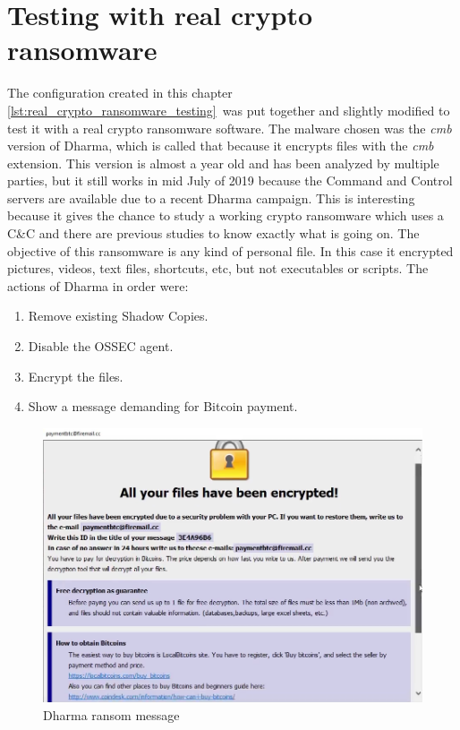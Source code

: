 \section{Testing with real crypto ransomware}
The configuration created in this chapter \ref{lst:real_crypto_ransomware_testing}\ was put together and slightly modified to test it with a real crypto ransomware software.
The malware chosen was the \textit{cmb} version of Dharma\cite{dharma}, which is called that because it encrypts files with the \textit{cmb} extension.
\linej
This version is almost a year old and has been analyzed by multiple parties, but it still works in mid July of 2019 because the Command and Control servers are available due to a recent Dharma campaign.
This is interesting because it gives the chance to study a working crypto ransomware which uses a C\&C and there are previous studies to know exactly what is going on.
\linej
\linej
The objective of this ransomware is any kind of personal file.
In this case it encrypted pictures, videos, text files, shortcuts, etc, but not executables or scripts.
The actions of Dharma in order were\cite{dharma}:
\begin{enumerate}
	\item Remove existing Shadow Copies.
	\item Disable the OSSEC agent.
	\item Encrypt the files.
	\item Show a message demanding for Bitcoin payment.
\end{enumerate}
\begin{figure}[H]
	\centering
	\includegraphics[width=.9\textwidth]{figuras/Bitcoin_Dharma.png}
	\caption{Dharma ransom message}
\end{figure}
